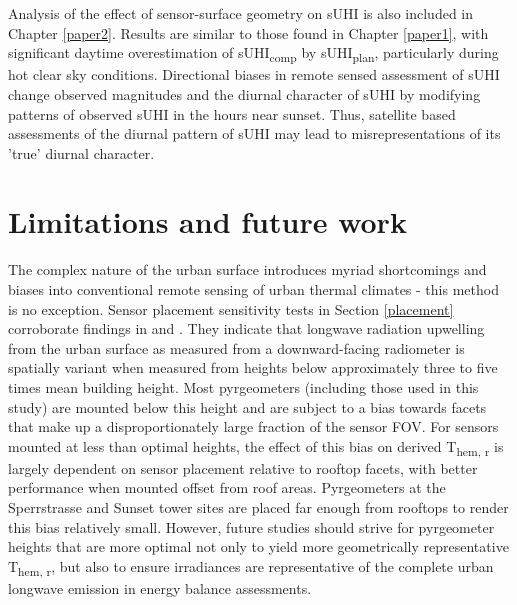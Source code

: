 \begin{bibunit}
Analysis of the effect of sensor-surface geometry on sUHI is also included in Chapter \ref{paper2}. Results are similar to those found in Chapter \ref{paper1}, with significant daytime overestimation of sUHI\textsubscript{comp} by sUHI\textsubscript{plan}, particularly during hot clear sky conditions. Directional biases in remote sensed assessment of sUHI change observed magnitudes and the diurnal character of sUHI by modifying patterns of observed sUHI in the hours near sunset. Thus, satellite based assessments of the diurnal pattern of sUHI may lead to misrepresentations of its 'true' diurnal character. 

\section{Limitations and future work}


The complex nature of the urban surface introduces myriad shortcomings and biases into conventional remote sensing of urban thermal climates - this method is no exception. Sensor placement sensitivity tests in Section \ref{placement} corroborate findings in \citet{Roberts2010} and \citet{Adderley2015}. They indicate that longwave radiation upwelling from the urban surface as measured from a downward-facing radiometer is spatially variant when measured from heights below approximately three to five times mean building height. Most pyrgeometers (including those used in this study) are mounted below this height and are subject to a bias towards facets that make up a disproportionately large fraction of the sensor FOV. For sensors mounted at less than optimal heights, the effect of this bias on derived T\textsubscript{hem, r} is largely dependent on sensor placement relative to rooftop facets, with better performance when mounted offset from roof areas. Pyrgeometers at the Sperrstrasse and Sunset tower sites are placed far enough from rooftops to render this bias relatively small. However, future studies should strive for pyrgeometer heights that are more optimal not only to yield more geometrically representative T\textsubscript{hem, r}, but also to ensure irradiances are representative of the complete urban longwave emission in energy balance assessments.


\end{bibunit}
